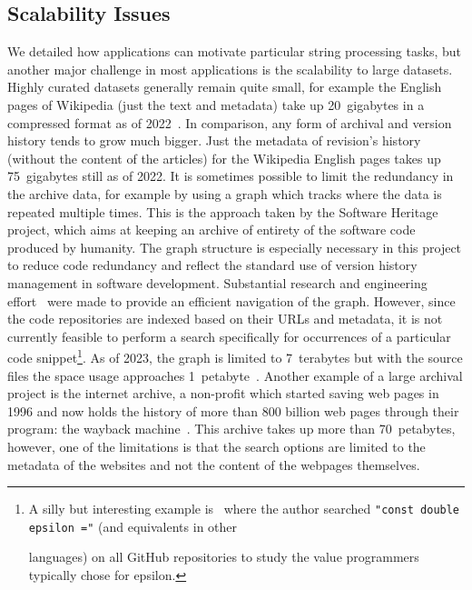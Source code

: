 \subsection{Scalability Issues}

 
We detailed how applications can motivate particular string processing tasks, but another major challenge in most applications is the scalability to large datasets.
Highly curated datasets generally remain quite small, for example the English pages of Wikipedia (just the text and metadata) take up 20~gigabytes in a compressed format as of 2022~\cite{wikimedia}. In comparison, any form of archival and version history tends to grow much bigger. Just the metadata of revision's history (without the content of the articles) for the Wikipedia English pages takes up 75~gigabytes still as of 2022.
It is sometimes possible to limit the redundancy in the archive data, for example by using a graph which tracks where the data is repeated multiple times. This is the approach taken by the Software Heritage~\cite{swh-site} project, which aims at keeping an archive of entirety of the software code produced by humanity. The graph structure is especially necessary in this project to reduce code redundancy and reflect the standard use of version history management in software development.
Substantial research and engineering effort~\cite{DBLP:phd/hal/Pietri21} were made to provide an efficient navigation of the graph. 
However, since the code repositories are indexed based on their URLs and metadata, it is not currently feasible to perform a search specifically for occurrences of a particular code snippet\footnote{\setlength\parindent{10pt} A silly but interesting example is~\cite{vii2014if} where the author searched \texttt{"const double epsilon ="} (and equivalents in other \par languages) on all GitHub repositories to study the value programmers typically chose for epsilon.}.
As of 2023, the graph is limited to 7~terabytes but with the source files the space usage approaches 1~petabyte~\cite{swh-polytechnique}.
Another example of a large archival project is the internet archive, a non-profit which started saving web pages in 1996 and now holds the history of more than 800 billion web pages through their program: the wayback machine~\cite{web-archive}. This archive takes up more than 70~petabytes, however, one of the limitations is that the search options are limited to the metadata of the websites and not the content of the webpages themselves.


